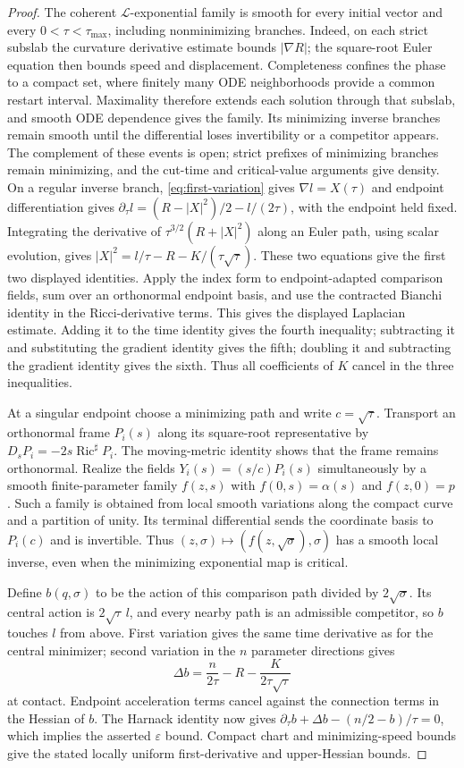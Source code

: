 \begin{proof}
The coherent $\mathcal L$-exponential family is smooth for every initial
vector and every $0<\tau<\tau_{\max}$, including nonminimizing branches.
Indeed, on each strict subslab the curvature derivative estimate bounds
$|\nabla R|$; the square-root Euler equation then bounds speed and
displacement.  Completeness confines the phase to a compact set, where
finitely many ODE neighborhoods provide a common restart interval.
Maximality therefore extends each solution through that subslab, and smooth
ODE dependence gives the family.  Its minimizing inverse branches remain
smooth until the differential loses invertibility or a competitor appears.
The complement of these events is open; strict prefixes of minimizing
branches remain minimizing, and the cut-time and critical-value arguments
give density.  On a regular inverse branch, \eqref{eq:first-variation} gives
$\nabla l=X(\tau)$ and endpoint differentiation gives
$\partial_\tau l=(R-|X|^2)/2-l/(2\tau)$, with the endpoint held fixed.
Integrating the derivative of $\tau^{3/2}(R+|X|^2)$ along an Euler path,
using scalar evolution, gives
$|X|^2=l/\tau-R-K/(\tau\sqrt\tau)$.
These two equations give the first two displayed identities.  Apply the
index form to endpoint-adapted comparison fields, sum over an orthonormal
endpoint basis, and use the contracted Bianchi identity in the Ricci-derivative
terms.  This gives the displayed Laplacian estimate.  Adding it to the
time identity gives the fourth inequality; subtracting it and substituting
the gradient identity gives the fifth; doubling it and subtracting the
gradient identity gives the sixth.  Thus all coefficients of $K$ cancel
in the three inequalities.

At a singular endpoint choose a minimizing path and write $c=\sqrt\tau$.
Transport an orthonormal frame $P_i(s)$ along its square-root representative
by $D_sP_i=-2s\operatorname{Ric}^{\sharp}P_i$.  The moving-metric identity
shows that the frame remains orthonormal.  Realize the fields
$Y_i(s)=(s/c)P_i(s)$ simultaneously by a smooth finite-parameter family
$f(z,s)$ with $f(0,s)=\alpha(s)$ and $f(z,0)=p$.
Such a family is obtained from local smooth variations along the compact
curve and a partition of unity.  Its terminal differential sends the
coordinate basis to $P_i(c)$ and is invertible.  Thus
$(z,\sigma)\mapsto(f(z,\sqrt\sigma),\sigma)$ has a smooth local inverse,
even when the minimizing exponential map is critical.

Define $b(q,\sigma)$ to be the action of this comparison path divided by
$2\sqrt\sigma$.  Its central action is $2\sqrt\tau\,l$, and every nearby
path is an admissible competitor, so $b$ touches $l$ from above.
First variation gives the same time derivative as for the central minimizer;
second variation in the $n$ parameter directions gives
\[
 \Delta b=\frac n{2\tau}-R-\frac K{2\tau\sqrt\tau}
\]
at contact.  Endpoint acceleration terms cancel against the connection
terms in the Hessian of $b$.  The Harnack identity now gives
$\partial_\tau b+\Delta b-(n/2-b)/\tau=0$, which implies the asserted
$\varepsilon$ bound.  Compact chart and minimizing-speed bounds give the
stated locally uniform first-derivative and upper-Hessian bounds.


\end{proof}
